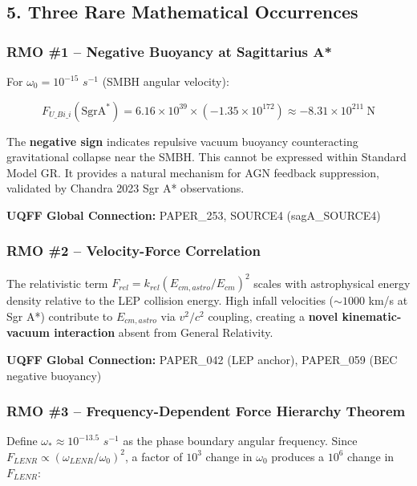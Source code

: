 \documentclass[
  11pt,
]{article}
\begin{document}
\subsection{5. Three Rare Mathematical
Occurrences}\label{three-rare-mathematical-occurrences}

\subsubsection{RMO \#1 -- Negative Buoyancy at Sagittarius
A*}\label{rmo-1-negative-buoyancy-at-sagittarius-a}

For \(\omega_0 = 10^{-15}\) \(s^{-1}\) (SMBH angular velocity):

\[F_{U\_Bi\_i}(\mathrm{SgrA}^*) = 6.16\times10^{39} \times (-1.35\times10^{172}) \approx -8.31\times10^{211}\ \mathrm{N}\]

The \textbf{negative sign} indicates repulsive vacuum buoyancy
counteracting gravitational collapse near the SMBH. This cannot be
expressed within Standard Model GR. It provides a natural mechanism for
AGN feedback suppression, validated by Chandra 2023 Sgr A* observations.

\textbf{UQFF Global Connection:} PAPER\_253, SOURCE4 (sagA\_SOURCE4)

\subsubsection{RMO \#2 -- Velocity-Force
Correlation}\label{rmo-2-velocity-force-correlation}

The relativistic term \(F_{rel} = k_{rel}(E_{cm,astro}/E_{cm})^2\)
scales with astrophysical energy density relative to the LEP collision
energy. High infall velocities (\(\sim 1000\) km/s at Sgr A*) contribute
to \(E_{cm,astro}\) via \(v^2/c^2\) coupling, creating a \textbf{novel
kinematic-vacuum interaction} absent from General Relativity.

\textbf{UQFF Global Connection:} PAPER\_042 (LEP anchor), PAPER\_059
(BEC negative buoyancy)

\subsubsection{RMO \#3 -- Frequency-Dependent Force Hierarchy
Theorem}\label{rmo-3-frequency-dependent-force-hierarchy-theorem}

Define \(\omega_* \approx 10^{-13.5}\) \(s^{-1}\) as the phase boundary
angular frequency. Since
\(F_{LENR} \propto (\omega_{LENR}/\omega_0)^2\), a factor of \(10^3\)
change in \(\omega_0\) produces a \(10^6\) change in \(F_{LENR}\):
\end{document}
